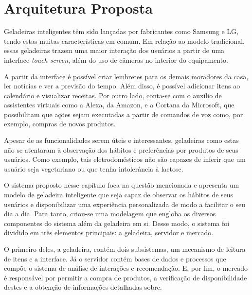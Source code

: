 \chapter{Arquitetura Proposta}
\label{cap:sistema_proposto}


Geladeiras inteligentes têm sido lançadas por fabricantes como Samsung e LG, tendo estas muitas características em comum. Em relação ao modelo tradicional, essas geladeiras trazem uma maior interação dos usuários a partir de uma interface \textit{touch screen}, além do uso de câmeras no interior do equipamento.

A partir da interface é possível criar lembretes para os demais moradores da casa, ler notícias e ver a previsão do tempo. Além disso, é possível adicionar itens ao calendário e visualizar receitas. Por outro lado, conta-se com o auxílio de assistentes virtuais como a Alexa, da Amazon, e a Cortana da Microsoft, que possibilitam que ações sejam executadas a partir de comandos de voz como, por exemplo, compras de novos produtos. 

Apesar de as funcionalidades serem úteis e interessantes, geladeiras como estas não se atentaram à observação dos hábitos e preferências por produtos de seus usuários. Como exemplo, tais eletrodomésticos não são capazes de inferir que um usuário seja vegetariano ou que tenha intolerância à lactose.

    


O sistema proposto nesse capítulo foca na questão mencionada e apresenta um modelo de geladeira inteligente que seja capaz de observar os hábitos de seus usuários e disponibilizar uma experiência personalizada de modo a facilitar o seu dia a dia. Para tanto, criou-se uma modelagem que engloba os diversos componentes do sistema além da geladeira em si. Desse modo, o sistema foi dividido em três elementos principais: a geladeira, servidor e mercado.

O primeiro deles, a geladeira, contém dois subsistemas, um mecanismo de leitura de itens e a interface. Já o servidor contém bases de dados e processos que compõe o sistema de análise de interações e recomendação. E, por fim, o mercado é responsável por permitir a compra de produtos, a verificação de disponibilidade destes e a obtenção de informações detalhadas sobre.
    

